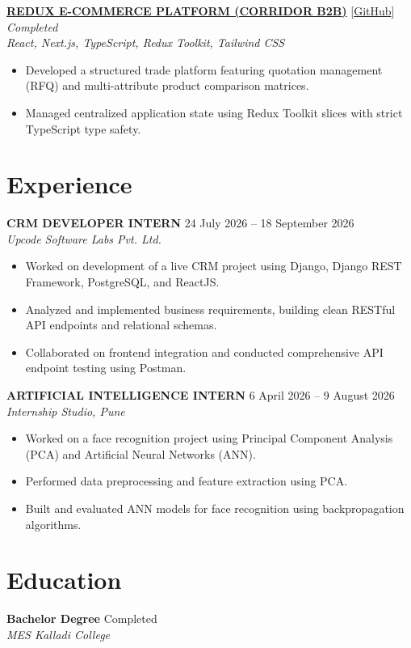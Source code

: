\documentclass[a4paper,9pt]{article}
\begin{document}
\vspace{2pt}
\href{https://github.com/shibinputhramannil/CORRIDOR}{\textbf{REDUX E-COMMERCE PLATFORM (CORRIDOR B2B)}} [\href{https://github.com/shibinputhramannil/CORRIDOR}{GitHub}] \hfill \textit{Completed}\\
\textit{React, Next.js, TypeScript, Redux Toolkit, Tailwind CSS}
\begin{itemize}
    \item Developed a structured trade platform featuring quotation management (RFQ) and multi-attribute product comparison matrices.
    \item Managed centralized application state using Redux Toolkit slices with strict TypeScript type safety.
\end{itemize}

\section*{Experience}
\textbf{CRM DEVELOPER INTERN} \hfill 24 July 2026 -- 18 September 2026\\
\textit{Upcode Software Labs Pvt. Ltd.}
\begin{itemize}
    \item Worked on development of a live CRM project using Django, Django REST Framework, PostgreSQL, and ReactJS.
    \item Analyzed and implemented business requirements, building clean RESTful API endpoints and relational schemas.
    \item Collaborated on frontend integration and conducted comprehensive API endpoint testing using Postman.
\end{itemize}

\vspace{2pt}
\textbf{ARTIFICIAL INTELLIGENCE INTERN} \hfill 6 April 2026 -- 9 August 2026\\
\textit{Internship Studio, Pune}
\begin{itemize}
    \item Worked on a face recognition project using Principal Component Analysis (PCA) and Artificial Neural Networks (ANN).
    \item Performed data preprocessing and feature extraction using PCA.
    \item Built and evaluated ANN models for face recognition using backpropagation algorithms.
\end{itemize}

\section*{Education}
\textbf{Bachelor Degree} \hfill Completed\\
\textit{MES Kalladi College}
\end{document}
